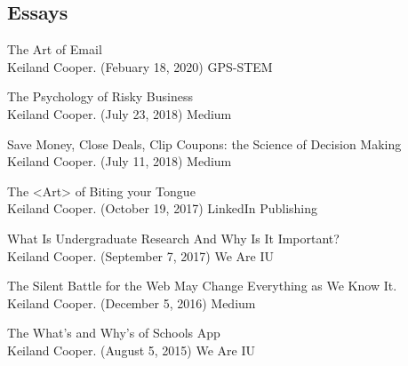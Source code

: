 \documentclass[10pt]{cooperCV2}
\begin{document}
\subsection{Essays} 
\begin{etaremune}[itemindent=-1.5\bibhang, topsep=0pt,
				   itemsep=\bibsep,partopsep=0pt,parsep=0pt,leftmargin={\bibhang+\widthof{[999]}}] 
    
    \item The Art of Email \\
     Keiland Cooper. (Febuary 18, 2020) GPS-STEM
     
	
    \item The Psychology of Risky Business \\
     Keiland Cooper. (July 23, 2018) Medium
     
	
    \item Save Money, Close Deals, Clip Coupons: the Science of Decision Making \\
     Keiland Cooper. (July 11, 2018) Medium
     
	
    \item The <Art> of Biting your Tongue \\
     Keiland Cooper. (October 19, 2017) LinkedIn Publishing
     
	
    \item What Is Undergraduate Research And Why Is It Important? \\
     Keiland Cooper. (September 7, 2017) We Are IU
     
	
    \item The Silent Battle for the Web May Change Everything as We Know It. \\
     Keiland Cooper. (December 5, 2016) Medium
     
	
    \item The What’s and Why’s of Schools App \\
     Keiland Cooper. (August 5, 2015) We Are IU
     
	

\end{etaremune}








%	
\end{document}
